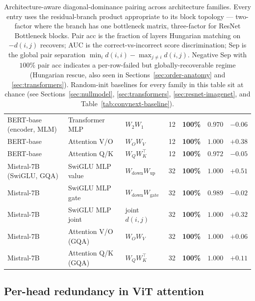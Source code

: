 \documentclass[10pt]{article}
\theoremstyle{remark}
\begin{document}
\begin{table}[H]
\begin{tabular}{lllcccc}
\midrule
BERT-base (encoder, MLM)   & Transformer MLP     & $W_2 W_1$                          & 12 & \textbf{100\%} & $0.970$ & $-0.06$ \\
BERT-base                  & Attention V/O       & $W_O W_V$                          & 12 & \textbf{100\%} & $1.000$ & $+0.38$ \\
BERT-base                  & Attention Q/K       & $W_Q W_K^\top$                     & 12 & \textbf{100\%} & $0.972$ & $-0.05$ \\
\midrule
Mistral-7B (SwiGLU, GQA)   & SwiGLU MLP value    & $W_{\mathrm{down}} W_{\mathrm{up}}$   & 32 & \textbf{100\%} & $1.000$ & $+0.51$ \\
Mistral-7B                 & SwiGLU MLP gate     & $W_{\mathrm{down}} W_{\mathrm{gate}}$ & 32 & \textbf{100\%} & $0.989$ & $-0.02$ \\
Mistral-7B                 & SwiGLU MLP joint    & joint $d(i,j)$                        & 32 & \textbf{100\%} & $1.000$ & $+0.32$ \\
Mistral-7B                 & Attention V/O (GQA) & $W_O W_V$                             & 32 & \textbf{100\%} & $1.000$ & $+0.06$ \\
Mistral-7B                 & Attention Q/K (GQA) & $W_Q W_K^\top$                        & 32 & \textbf{100\%} & $1.000$ & $+0.11$ \\
\bottomrule
\end{tabular}
\caption{Architecture-aware diagonal-dominance pairing across architecture
families. Every entry uses the residual-branch product appropriate to
its block topology --- two-factor where the branch has one bottleneck
matrix, three-factor for ResNet Bottleneck blocks. Pair acc is the
fraction of layers Hungarian matching on $-d(i,j)$ recovers; AUC is the
correct-vs-incorrect score discrimination; Sep is the global pair
separation $\min_i d(i,i) - \max_{j \neq i} d(i,j)$. Negative Sep with
$100\%$ pair acc indicates a per-row-failed but globally-recoverable
regime (Hungarian rescue, also seen in Sections~\ref{sec:order-anatomy}
and \ref{sec:transformers}). Random-init baselines for every family in
this table sit at chance (see Sections~\ref{sec:nullmodel},
\ref{sec:transformers}, \ref{sec:resnet-imagenet}, and
Table~\ref{tab:convnext-baseline}).}\label{tab:archmaster}
\end{table}

\subsection{Per-head redundancy in ViT attention}\label{sec:vit-perhead}
\end{document}
